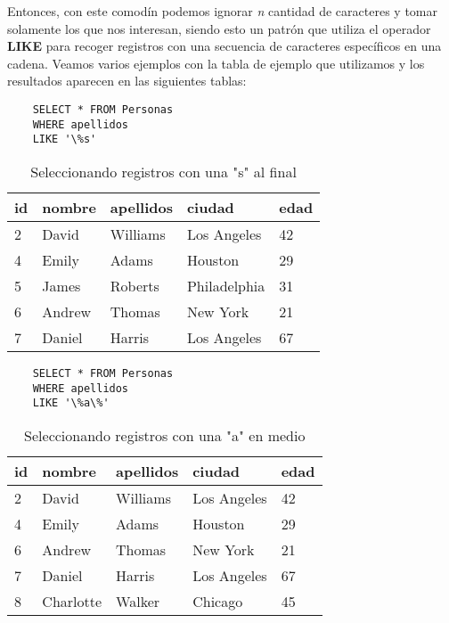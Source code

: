 Entonces, con este comodín podemos ignorar \textit{n} cantidad de caracteres y tomar solamente los que nos interesan, siendo esto un patrón que utiliza el operador \textbf{LIKE} para recoger registros con una secuencia de caracteres específicos en una cadena. Veamos varios ejemplos con la tabla de ejemplo que utilizamos y los resultados aparecen en las siguientes tablas:
\begin{lstlisting}
    SELECT * FROM Personas
    WHERE apellidos
    LIKE '\%s'
\end{lstlisting}
\begin{table}[H]
    \centering
    \caption{Seleccionando registros con una "s" al final}
    \label{tab: 12}
    \begin{tabular}{|l|l|l|l|l|}
        \hline
        \textbf{id} & \textbf{nombre} & \textbf{apellidos} & \textbf{ciudad} & \textbf{edad} \\
        \hline
        2 & David       & Williams  & Los Angeles   & 42 \\
        \hline
        4 & Emily       & Adams     & Houston       & 29 \\
        \hline
        5 & James       & Roberts   & Philadelphia  & 31 \\
        \hline
        6 & Andrew      & Thomas    & New York      & 21 \\
        \hline
        7 & Daniel      & Harris    & Los Angeles   & 67 \\
        \hline
    \end{tabular}
\end{table}
\begin{lstlisting}
    SELECT * FROM Personas
    WHERE apellidos
    LIKE '\%a\%'
\end{lstlisting}
\begin{table}[H]
    \centering
    \caption{Seleccionando registros con una "a" en medio}
    \label{tab: 13}
    \begin{tabular}{|l|l|l|l|l|}
        \hline
        \textbf{id} & \textbf{nombre} & \textbf{apellidos} & \textbf{ciudad} & \textbf{edad} \\
        \hline
        2 & David       & Williams  & Los Angeles   & 42 \\
        \hline
        4 & Emily       & Adams     & Houston       & 29 \\
        \hline
        6 & Andrew      & Thomas    & New York      & 21 \\
        \hline
        7 & Daniel      & Harris    & Los Angeles   & 67 \\
        \hline
        8 & Charlotte   & Walker    & Chicago       & 45 \\
        \hline
    \end{tabular}
\end{table}

